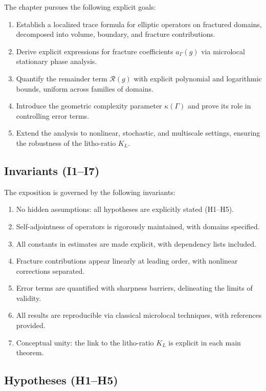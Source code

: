 The chapter pursues the following explicit goals:
\begin{enumerate}[label=\textbf{G\arabic*}]
    \item Establish a localized trace formula for elliptic operators on fractured domains, decomposed into volume, boundary, and fracture contributions.
    \item Derive explicit expressions for fracture coefficients $a_\Gamma(g)$ via microlocal stationary phase analysis.
    \item Quantify the remainder term $\mathcal{R}(g)$ with explicit polynomial and logarithmic bounds, uniform across families of domains.
    \item Introduce the geometric complexity parameter $\kappa(\Gamma)$ and prove its role in controlling error terms.
    \item Extend the analysis to nonlinear, stochastic, and multiscale settings, ensuring the robustness of the litho-ratio $K_L$.
\end{enumerate}

\subsection*{Invariants (I1–I7)}

The exposition is governed by the following invariants:
\begin{enumerate}[label=\textbf{I\arabic*}]
    \item No hidden assumptions: all hypotheses are explicitly stated (H1–H5).
    \item Self-adjointness of operators is rigorously maintained, with domains specified.
    \item All constants in estimates are made explicit, with dependency lists included.
    \item Fracture contributions appear linearly at leading order, with nonlinear corrections separated.
    \item Error terms are quantified with sharpness barriers, delineating the limits of validity.
    \item All results are reproducible via classical microlocal techniques, with references provided.
    \item Conceptual unity: the link to the litho-ratio $K_L$ is explicit in each main theorem.
\end{enumerate}

\subsection*{Hypotheses (H1–H5)}

